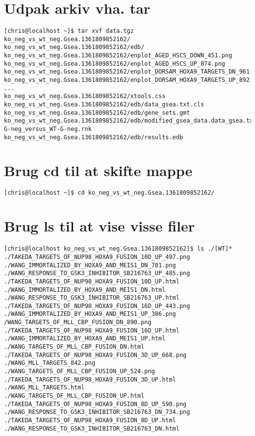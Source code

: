 \documentclass[12pt]{article}
\begin{document}
\section{Udpak arkiv vha. tar}

\begin{lstlisting}
[chris@localhost ~]$ tar xvf data.tgz 
ko_neg_vs_wt_neg.Gsea.1361809852162/
ko_neg_vs_wt_neg.Gsea.1361809852162/edb/
ko_neg_vs_wt_neg.Gsea.1361809852162/enplot_AGED_HSCS_DOWN_451.png
ko_neg_vs_wt_neg.Gsea.1361809852162/enplot_AGED_HSCS_UP_874.png
ko_neg_vs_wt_neg.Gsea.1361809852162/enplot_DORSAM_HOXA9_TARGETS_DN_961.png
ko_neg_vs_wt_neg.Gsea.1361809852162/enplot_DORSAM_HOXA9_TARGETS_UP_892.png
...
ko_neg_vs_wt_neg.Gsea.1361809852162/xtools.css
ko_neg_vs_wt_neg.Gsea.1361809852162/edb/data_gsea.txt.cls
ko_neg_vs_wt_neg.Gsea.1361809852162/edb/gene_sets.gmt
ko_neg_vs_wt_neg.Gsea.1361809852162/edb/modified_gsea_data.data_gsea.txt.cls_KO-G-neg_versus_WT-G-neg.rnk
ko_neg_vs_wt_neg.Gsea.1361809852162/edb/results.edb
\end{lstlisting}

\section{Brug cd til at skifte mappe}

\begin{lstlisting}
[chris@localhost ~]$ cd ko_neg_vs_wt_neg.Gsea.1361809852162/
\end{lstlisting}

\section{Brug ls til at vise visse filer}

\begin{lstlisting}
[chris@localhost ko_neg_vs_wt_neg.Gsea.1361809852162]$ ls ./[WT]*
./TAKEDA_TARGETS_OF_NUP98_HOXA9_FUSION_10D_UP_497.png
./WANG_IMMORTALIZED_BY_HOXA9_AND_MEIS1_DN_701.png
./WANG_RESPONSE_TO_GSK3_INHIBITOR_SB216763_UP_485.png
./TAKEDA_TARGETS_OF_NUP98_HOXA9_FUSION_10D_UP.html
./WANG_IMMORTALIZED_BY_HOXA9_AND_MEIS1_DN.html
./WANG_RESPONSE_TO_GSK3_INHIBITOR_SB216763_UP.html
./TAKEDA_TARGETS_OF_NUP98_HOXA9_FUSION_16D_UP_443.png
./WANG_IMMORTALIZED_BY_HOXA9_AND_MEIS1_UP_386.png
/WANG_TARGETS_OF_MLL_CBP_FUSION_DN_890.png
./TAKEDA_TARGETS_OF_NUP98_HOXA9_FUSION_16D_UP.html
./WANG_IMMORTALIZED_BY_HOXA9_AND_MEIS1_UP.html
./WANG_TARGETS_OF_MLL_CBP_FUSION_DN.html
./TAKEDA_TARGETS_OF_NUP98_HOXA9_FUSION_3D_UP_668.png
./WANG_MLL_TARGETS_842.png
./WANG_TARGETS_OF_MLL_CBP_FUSION_UP_524.png
./TAKEDA_TARGETS_OF_NUP98_HOXA9_FUSION_3D_UP.html
./WANG_MLL_TARGETS.html
./WANG_TARGETS_OF_MLL_CBP_FUSION_UP.html
./TAKEDA_TARGETS_OF_NUP98_HOXA9_FUSION_8D_UP_590.png
./WANG_RESPONSE_TO_GSK3_INHIBITOR_SB216763_DN_734.png
./TAKEDA_TARGETS_OF_NUP98_HOXA9_FUSION_8D_UP.html
./WANG_RESPONSE_TO_GSK3_INHIBITOR_SB216763_DN.html
\end{lstlisting}
\end{document}
